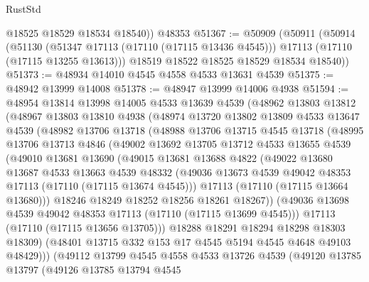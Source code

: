 \begin{lexlean}{RustStd}
\begin{coremodule}
        @18525
        @18529
        @18534
        @18540))
    @48353
@51367 := @50909
    (@50911
      (@50914
        (@51130
          (@51347 @17113 (@17110 (@17115 @13436 @4545)))
          @17113
          (@17110 (@17115 @13255 @13613)))
        @18519
        @18522
        @18525
        @18529
        @18534
        @18540))
@51373 := @48934 @14010 @4545 @4558 @4533 @13631 @4539
@51375 := @48942 @13999 @14008
@51378 := @48947 @13999 @14006 @4938
@51594 := @48954
    @13814
    @13998
    @14005
    @4533
    @13639
    @4539
    (@48962
      @13803
      @13812
      (@48967
        @13803
        @13810
        @4938
        (@48974
          @13720
          @13802
          @13809
          @4533
          @13647
          @4539
          (@48982
            @13706
            @13718
            (@48988
              @13706
              @13715
              @4545
              @13718
              (@48995
                @13706
                @13713
                @4846
                (@49002
                  @13692
                  @13705
                  @13712
                  @4533
                  @13655
                  @4539
                  (@49010
                    @13681
                    @13690
                    (@49015
                      @13681
                      @13688
                      @4822
                      (@49022
                        @13680
                        @13687
                        @4533
                        @13663
                        @4539
                        @48332
                        (@49036 @13673 @4539 @49042 @48353 @17113 (@17110 (@17115 @13674 @4545)))
                        @17113
                        (@17110 (@17115 @13664 @13680)))
                      @18246
                      @18249
                      @18252
                      @18256
                      @18261
                      @18267))
                  (@49036 @13698 @4539 @49042 @48353 @17113 (@17110 (@17115 @13699 @4545)))
                  @17113
                  (@17110 (@17115 @13656 @13705)))
                @18288
                @18291
                @18294
                @18298
                @18303
                @18309)
              (@48401 @13715 @332 @153 @17 @4545 @5194 @4545 @4648 @49103 @48429)))
          (@49112
            @13799
            @4545
            @4558
            @4533
            @13726
            @4539
            (@49120
              @13785
              @13797
              (@49126
                @13785
                @13794
                @4545

\end{coremodule}
\end{lexlean}
